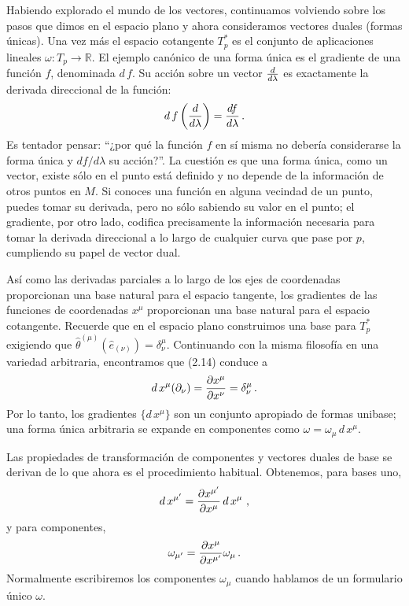 \documentclass[11pt,b5paper,openany,twoside]{book}
\newcommand{\e}[1]{\hat{e}_{(#1)}}
\newcommand{\ztheta}[1]{{\hat{\theta}}^{(#1)}}
\newcommand{\p}[1]{{\partial_{#1}}}
\newcommand{\R}{\mathbb{R}}
\begin{document}
Habiendo explorado el mundo de los vectores, continuamos volviendo sobre los pasos que dimos en el espacio plano y ahora consideramos vectores duales (formas únicas).
Una vez más el espacio cotangente $T^*_p$ es el conjunto de aplicaciones lineales $\omega:T_p\rightarrow\R$.
El ejemplo canónico de una forma única es el gradiente de una función $f$, denominada $ d\,f$.
Su acción sobre un vector ${d\over{d\lambda}}$ es exactamente la derivada direccional de la función:
\begin{equation}
 d\,f\left({d\over{d\lambda}}\right)={{df}\over{d\lambda}}\,.\label{2.14}
\end{equation}
Es tentador pensar: ``¿por qué la función $f$ en sí misma no debería considerarse la forma única y $df/d\lambda$ su acción?''. La cuestión es que una forma única, como un vector, existe sólo en el punto está definido y no depende de la información de otros puntos en $M$.
Si conoces una función en alguna vecindad de un punto, puedes tomar su derivada, pero no sólo sabiendo su valor en el punto; el gradiente, por otro lado, codifica precisamente la información necesaria para tomar la derivada direccional a lo largo de cualquier curva que pase por $p$, cumpliendo su papel de vector dual.

Así como las derivadas parciales a lo largo de los ejes de coordenadas proporcionan una base natural para el espacio tangente, los gradientes de las funciones de coordenadas $x^\mu$ proporcionan una base natural para el espacio cotangente.
Recuerde que en el espacio plano construimos una base para $T^*_p$ exigiendo que $ \ztheta{\mu}(\e\nu)=\delta^\mu_\nu$.
Continuando con la misma filosofía en una variedad arbitraria, encontramos que (2.14) conduce a
\begin{equation}
 d\,x^\mu(\p\nu) = {{\partial x^\mu}\over{\partial x^\nu}}
=\delta^\mu_\nu\,.\label{2.15}
\end{equation}
Por lo tanto, los gradientes $\{ d\,x^\mu\}$ son un conjunto apropiado de formas unibase; una forma única arbitraria se expande en componentes como $\omega = \omega_\mu\, d\,x^\mu$.

Las propiedades de transformación de componentes y vectores duales de base se derivan de lo que ahora es el procedimiento habitual.
Obtenemos, para bases uno,
\begin{equation}
 d\,x^{\mu'} = {{\partial x^{\mu'}}\over{\partial x^{\mu}}}\, d\,x^\mu
\ ,\label{2.16}
\end{equation}
y para componentes,
\begin{equation}
\omega_{\mu'} = {{\partial x^{\mu}}\over{\partial x^{\mu'}}}\omega_\mu
\,.\label{2.17}
\end{equation}
Normalmente escribiremos los componentes $\omega_\mu$ cuando hablamos de un formulario único $\omega$.
\end{document}
